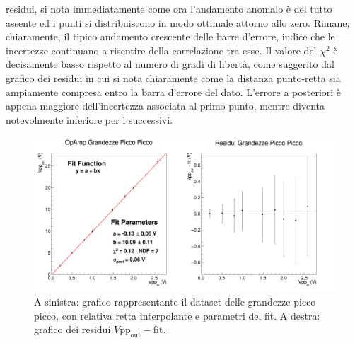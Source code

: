 \documentclass[a4paper,11pt]{article} %
\begin{document}
residui, si nota immediatamente come ora l'andamento anomalo è del tutto assente ed i punti si distribuiscono in modo
ottimale attorno allo zero. Rimane, chiaramente, il tipico andamento crescente delle barre d'errore, indice che le
incertezze continuano a risentire della correlazione tra esse. Il valore del $\chi^2$ è decisamente basso rispetto al
numero di gradi di libertà, come suggerito dal grafico dei residui in cui si nota chiaramente come la distanza
punto-retta sia ampiamente compresa entro la barra d'errore del dato. L'errore a posteriori è appena maggiore
dell'incertezza associata al primo punto, mentre diventa notevolmente inferiore per i successivi.
\begin{figure}[H]
	\centering
	\includegraphics[width=\linewidth]{../Plots/Report_Plots/opamp_plot_pp_projected.png}
	\caption{\small A sinistra: grafico rappresentante il dataset delle grandezze picco picco, 
	con relativa retta interpolante e parametri del fit. A destra: grafico dei residui $V\text{pp}_{\text{out}}-\text{fit}$.}
	\label{i:opamp_pp}
\end{figure}
\end{document}
